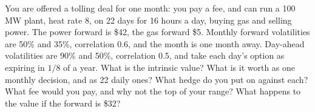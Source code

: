 \begin{question}\label{iq:iv2:commodities-and-energy:20}
You are offered a tolling deal for one month: you pay a fee, and can run a 100 MW plant, heat rate 8, on 22 days for 16 hours a day, buying gas and selling power. The power forward is \$42, the gas forward \$5. Monthly forward volatilities are 50\% and 35\%, correlation 0.6, and the month is one month away. Day-ahead volatilities are 90\% and 50\%, correlation 0.5, and take each day's option as expiring in $1/8$ of a year. What is the intrinsic value? What is it worth as one monthly decision, and as 22 daily ones? What hedge do you put on against each? What fee would you pay, and why not the top of your range? What happens to the value if the forward is \$32?
\end{question}
